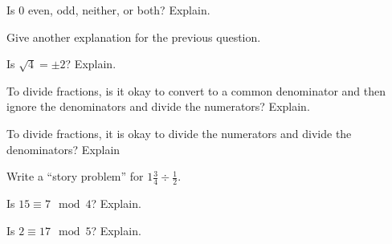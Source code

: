 \documentclass{ximera}
\begin{document}
\begin{question}
Is $0$ even, odd, neither, or both?  Explain.  
\begin{freeResponse}
\end{freeResponse}
\end{question}

\begin{question}
Give another explanation for the previous question.   
\begin{freeResponse}
\end{freeResponse}
\end{question}

\begin{question}
Is $\sqrt{4}=\pm2$?  Explain.  
\begin{freeResponse}
\end{freeResponse}
\end{question}

\begin{question}
To divide fractions, is it okay to convert to a common denominator and then ignore the denominators and divide the numerators?  Explain. 
\begin{freeResponse}
\end{freeResponse}
\end{question}

\begin{question}
To divide fractions, it is okay to divide the numerators and divide the denominators?  Explain
\begin{freeResponse}
\end{freeResponse}
\end{question}

\begin{question}
Write a ``story problem'' for $1\frac{3}{4}\div\frac{1}{2}$.  
\begin{freeResponse}
\end{freeResponse}
\end{question}

\begin{question}
Is $15 \equiv 7 \mod 4$?  Explain.  
\begin{freeResponse}
\end{freeResponse}
\end{question}

\begin{question}
Is $2 \equiv 17 \mod 5$?  Explain.  
\begin{freeResponse}
\end{freeResponse}
\end{question}
\end{document}
